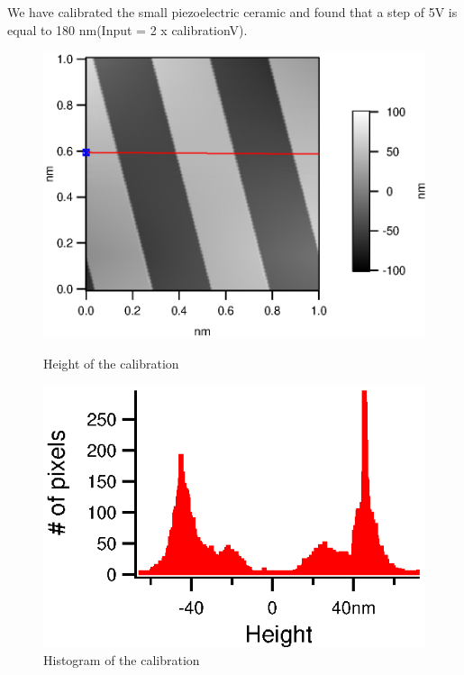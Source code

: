 We have calibrated the small piezoelectric ceramic and found that a step of 5V is equal to 180 nm(Input = 2 x calibrationV).

\begin{figure}[!ht]
\begin{minipage}[b]{0.45\linewidth}
\centering
\includegraphics[width=\textwidth]{images/Calib1vPP_HeightMap.eps}
\caption{Height of the calibration}
\label{fig:figure1}
\end{minipage}
\hspace{0.5cm}
\begin{minipage}[b]{0.45\linewidth}
\centering
\includegraphics[width=\textwidth]{images/Calib1VppHisto.eps}
\caption{Histogram of the calibration}
\label{fig:figure2}
\end{minipage}
\end{figure}

